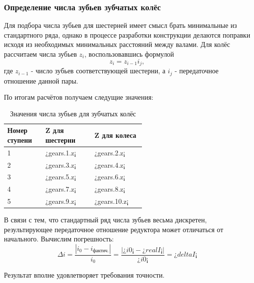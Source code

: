 \documentclass[14pt,a4paper,russian]{scrartcl}
\begin{document}
    \subsubsection{Определение числа зубьев зубчатых колёс}
        Для подбора числа зубьев для шестерней имеет смысл брать минимальные из стандартного ряда,
        однако в процессе разработки конструкции делаются поправки исходя из необходимых
        минимальных расстояний между валами.
        Для колёс рассчитаем числа зубьев \( z_i \), воспользовавшись формулой
        \[ z_i = z_{i-1}i_j, \]
        где \( z_{i-1} \) - число зубьев соответствующей шестерни, а \( i_j \) - 
        передаточное отношение данной пары.
        
        По итогам расчётов получаем следущие значения:
        \begin{table}[h!]
            \begin{center}
                \begin{tabular}{p{0.13\linewidth}p{0.23\linewidth}p{0.2\linewidth}}
                    \hline
                    Номер ступени & Z для шестерни & Z для колеса \\
                    \hline
                    1   &   ¿gears.1.z¡ & ¿gears.2.z¡ \\
                    2   &   ¿gears.3.z¡ & ¿gears.4.z¡ \\
                    3   &   ¿gears.5.z¡ & ¿gears.6.z¡ \\
                    4   &   ¿gears.7.z¡ & ¿gears.8.z¡ \\
                    5   &   ¿gears.9.z¡ & ¿gears.10.z¡ \\
                    \hline
                \end{tabular}
                \caption{Значения числа зубьев для зубчатых колёс}\label{tab:gears_z}
            \end{center}
        \end{table}
        
        В связи с тем, что стандартный ряд числа зубьев весьма дискретен, 
        результирующее передаточное отношение редуктора может отличаться от начального.
        Вычислим погрешность:
        \[ \Delta i = \frac{|i_0 - i_{\text{фактич.}}|}{i_0} =  
            \frac{|¿i0¡-¿realI¡|}{¿i0¡} = ¿deltaI¡\]
        
        Результат вполне удовлетворяет требования точности.
        
\end{document}
